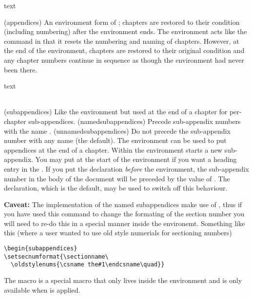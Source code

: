 \begin{syntax}
 text \\
\end{syntax}
\glossary(appendices)%
  {}%
  {An environment form of ; chapters are restored to their condition
   (including numbering) after the environment ends.}
The  environment acts like the \cmd{\appendix}
command in that it resets the numbering and naming of chapters.
However, at the end of the environment, chapters are restored to their original
condition and any chapter numbers continue in sequence as though the
 environment had never been there.

\begin{syntax}
 text  \\
\cmd{\namedsubappendices} \cmd{\unnamedsubappendices} \\
\end{syntax}
\glossary(subappendices)%
  {}%
  {Like the  environment but used at the end of a chapter
   for per-chapter sub-appendices.}
\glossary(namedsubappendices)%
  {}%
  {Precede sub-appendix numbers with the name .}
\glossary(unnamedsubappendices)%
  {}%
  {Do not precede the sub-appendix number with any name (the default).}
The  environment can be used to put appendices at the end
of a chapter. Within the environment \cmd{\section} starts a
new sub-appendix. You may put \cmd{\addappheadtotoc} at the start
of the environment if you want a heading entry in the \toc.
If you put the declaration \cmd{\namedsubappendices}
\emph{before} the  environment, the sub-appendix number
in the body of the document will be preceded by the value of
\cmd{\appendixname}. The \cmd{\unnamedsubappendices} declaration, which is the
default, may be used to switch off this behaviour.

\textbf{Caveat:} The implementation of the named subappendices make
use of \cmd{\setsecnumformat}, thus if you have used this command to
change the formating of the section number you will need to re-do this
in a special manner inside the 
environemt. Something like this (where a user wanted to use old style
numerials for sectioning numbers)
\begin{verbatim}
\begin{subappendices}
\setsecnumformat{\sectionname\
  \oldstylenums{\csname the#1\endcsname\quad}}
\end{verbatim}
The macro  is a special macro that only lives inside
the \Ie{subappendices} environment and is only available when
\cmd{\namedsubappendices} is applied.



